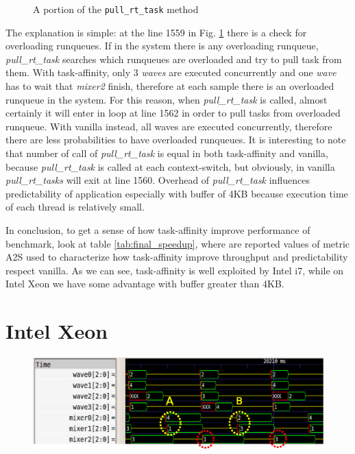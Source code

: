 \begin{description}
\begin{figure}[h]
  \lstset{basicstyle=\footnotesize, language=c, captionpos=b, frame=single,label=lis:steps}
  
  \label{code:pull_task_code}
  \caption{A portion of the \texttt{pull\_rt\_task} method}
\end{figure}

The explanation is simple: at the line 1559 in Fig. \ref{code:pull_task_code} there is a check for overloading runqueues. If in the system there is any 
overloading runqueue, \textit{pull\_rt\_task} searches which runqueues are overloaded and try to pull task from them. With task-affinity, only 3 
\textit{waves} are executed concurrently and one \textit{wave} has to wait that \textit{mixer2} finish, therefore at each sample there is an overloaded 
runqueue in the system. For this reason, when \textit{pull\_rt\_task} is called, almost certainly it will enter in loop at line 1562 in order to pull tasks 
from overloaded runqueue. With vanilla instead, all waves are executed concurrently, therefore there are less probabilities to have overloaded runqueues. 
It is interesting to note that number of call of \textit{pull\_rt\_task} is equal in both task-affinity and vanilla, because \textit{pull\_rt\_task} 
is called at each context-switch, but obviously, in vanilla \textit{pull\_rt\_tasks} will exit at line 1560. Overhead of \textit{pull\_rt\_task} 
influences predictability of application especially with buffer of 4KB because execution time of each thread is relatively small.

\end{description}

In conclusion, to get a sense of how task-affinity improve performance of benchmark, look at table \ref{tab:final_speedup}, where are reported values of 
metric A2S used to characterize how task-affinity improve throughput and predictability respect vanilla. As we can see, task-affinity is well exploited by
Intel i7, while on Intel Xeon we have some advantage with buffer greater than 4KB.
\section{Intel Xeon}

\begin{figure}[htbp]
\centering
\includegraphics[width=\widefigure]{images/results_xeon/final_xeon.eps}
\caption{}
\label{fig:trace_xeon}
\end{figure}

